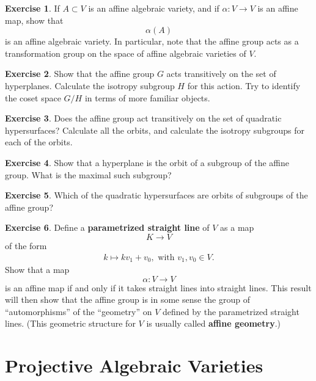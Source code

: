 \documentclass[12pt]{book}
\theoremstyle{plain}
\theoremstyle{definition}
\newtheorem{exercise}{Exercise}[section]
\begin{document}
\begin{exercise}
    If $A \subset V$ is an affine algebraic variety, and if $\alpha: V \to V$ is an affine map, show that
    $$\alpha(A)$$
    is an affine algebraic variety.
    In particular, note that the affine group acts as a transformation group on the space of affine algebraic varieties of $V$.
\end{exercise}

\begin{exercise}
    Show that the affine group $G$ acts transitively on the set of hyperplanes.
    Calculate the isotropy subgroup $H$ for this action.
    Try to identify the coset space $G/H$ in terms of more familiar objects.
\end{exercise}

\begin{exercise}
    Does the affine group act transitively on the set of quadratic hypersurfaces?
    Calculate all the orbits, and calculate the isotropy subgroups for each of the orbits.
\end{exercise}

\begin{exercise}
    Show that a hyperplane is the orbit of a subgroup of the affine group.
    What is the maximal such subgroup?
\end{exercise}

\begin{exercise}
    Which of the quadratic hypersurfaces are orbits of subgroups of the affine group?
\end{exercise}

\begin{exercise}
    Define a \textbf{parametrized straight line} of $V$ as a map
    $$K \to V$$
    of the form
    \begin{align} \label{fn:AffineMap1}
        k \mapsto kv_1 + v_0, \text{ with } v_1, v_0 \in V.
    \end{align}
    Show that a map
    $$\alpha: V \to V$$
    is an affine map if and only if it takes straight lines into straight lines.
    This result will then show that the affine group is in some sense the group of ``automorphisms'' of the ``geometry'' on $V$ defined by the parametrized straight lines.
    (This geometric structure for $V$ is usually called \textbf{affine geometry}.)
\end{exercise}

\section{Projective Algebraic Varieties}
\end{document}
